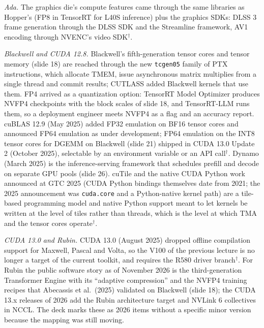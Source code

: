 \documentclass[11pt,letterpaper]{article}
\begin{document}
\emph{Ada.} The graphics die's compute features came through the same libraries as Hopper's (FP8 in TensorRT for L40S inference) plus the graphics SDKs: DLSS 3 frame generation through the DLSS SDK and the Streamline framework, AV1 encoding through NVENC's video SDK$^\dagger$.

\emph{Blackwell and CUDA 12.8.} Blackwell's fifth-generation tensor cores and tensor memory (slide 18) are reached through the new \texttt{tcgen05} family of PTX instructions, which allocate TMEM, issue asynchronous matrix multiplies from a single thread and commit results; CUTLASS added Blackwell kernels that use them. FP4 arrived as a quantization option: TensorRT Model Optimizer produces NVFP4 checkpoints with the block scales of slide 18, and TensorRT-LLM runs them, so a deployment engineer meets NVFP4 as a flag and an accuracy report. cuBLAS 12.9 (May 2025) added FP32 emulation on BF16 tensor cores and announced FP64 emulation as under development; FP64 emulation on the INT8 tensor cores for DGEMM on Blackwell (slide 21) shipped in CUDA 13.0 Update 2 (October 2025), selectable by an environment variable or an API call$^\dagger$. Dynamo (March 2025) is the inference-serving framework that schedules prefill and decode on separate GPU pools (slide 26). cuTile and the native CUDA Python work announced at GTC 2025 (CUDA Python bindings themselves date from 2021; the 2025 announcement was \texttt{cuda.core} and a Python-native kernel path) are a tile-based programming model and native Python support meant to let kernels be written at the level of tiles rather than threads, which is the level at which TMA and the tensor cores operate$^\dagger$.

\emph{CUDA 13.0 and Rubin.} CUDA 13.0 (August 2025) dropped offline compilation support for Maxwell, Pascal and Volta, so the V100 of the previous lecture is no longer a target of the current toolkit, and requires the R580 driver branch$^\dagger$. For Rubin the public software story as of November 2026 is the third-generation Transformer Engine with its ``adaptive compression'' and the NVFP4 training recipes that Abecassis et al.\ (2025) validated on Blackwell (slide 18); the CUDA 13.x releases of 2026 add the Rubin architecture target and NVLink 6 collectives in NCCL. The deck marks these as 2026 items without a specific minor version because the mapping was still moving.
\end{document}
